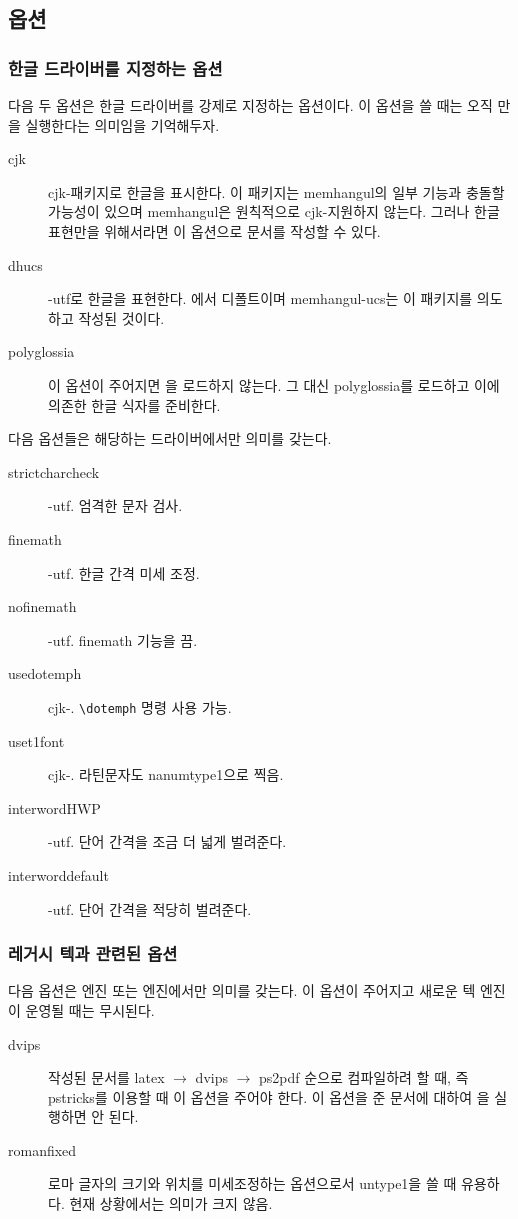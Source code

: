 \documentclass[
	12pt,
	a4paper,
	kosection,
	footnote,
	nobookmarks,
	microtype,
	figtabcapt,
]{oblivoir}
\newcommand\obclass{ob\-liv\-oir\oblivoirallowbreak}
\begin{document}
\subsection{ 옵션}

\subsubsection{한글 드라이버를 지정하는 옵션}

다음 두 옵션은 한글 드라이버를 강제로 지정하는 옵션이다. 이 옵션을 쓸 때는 오직 만을 
실행한다는 의미임을 기억해두자.
\begin{description}
\item [cjk] cjk-\ko 패키지로 한글을 표시한다. 이 패키지는 memhangul의 일부 기능과 충돌할 가능성이
있으며 memhangul은 원칙적으로 cjk- 지원하지 않는다. 그러나 한글 표현만을 위해서라면 이 옵션으로
문서를 작성할 수 있다.
\item [dhucs] \koTeX-utf로 한글을 표현한다. 에서 디폴트이며 memhangul-ucs는
이 패키지를 의도하고 작성된 것이다.
\item [polyglossia] 이 옵션이 주어지면 \koTeX 을 로드하지 않는다. 그 대신 \textsf{polyglossia}를 로드하고 이에 의존한 한글 식자를 준비한다.
\end{description}

다음 옵션들은 해당하는 드라이버에서만 의미를 갖는다.
\begin{description}
\item [strictcharcheck] \koTeX-utf. 엄격한 문자 검사.
\item [finemath] \koTeX-utf. 한글 간격 미세 조정.
\item [nofinemath] \koTeX-utf. finemath 기능을 끔.
\item [usedotemph] cjk-\ko. \verb|\dotemph| 명령 사용 가능.
\item [uset1font] cjk-\ko. 라틴문자도 nanumtype1으로 찍음.
\item [interwordHWP] \koTeX-utf. 단어 간격을 조금 더 넓게 벌려준다.
\item [interworddefault] \koTeX-utf. 단어 간격을 적당히 벌려준다.
\end{description}

\subsubsection{레거시 텍과 관련된 옵션}

다음 옵션은  엔진 또는  엔진에서만 의미를 갖는다. 이 옵션이 주어지고
새로운 텍 엔진이 운영될 때는 무시된다.
\begin{description}
\item [dvips]  작성된 문서를 latex $\rightarrow$ dvips $\rightarrow$ ps2pdf 순으로
컴파일하려 할 때, 즉 pstricks를 이용할 때 이 옵션을 주어야 한다. 이 옵션을 준 문서에 대하여 을 
실행하면 안 된다.
\item [romanfixed] 로마 글자의 크기와 위치를 미세조정하는 옵션으로서 untype1을 쓸 때 유용하다. 현재 상황에서는 의미가 크지 않음.
\end{description}
\end{document}
